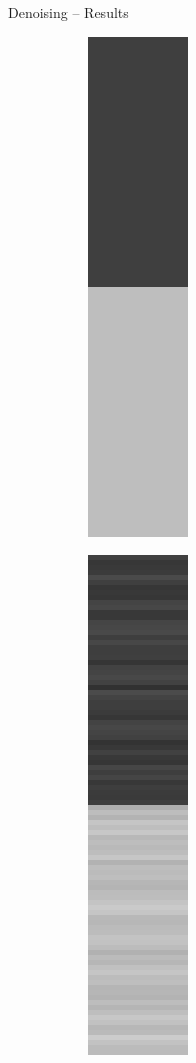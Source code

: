 \documentclass[t]{beamer}
\begin{document}
	\begin{frame}{Denoising -- Results}
		\begin{figure}[t]
			\centering
			\begin{subfigure}[t]{0.08\textwidth}
				\includegraphics[scale=0.25]{../paper/pictures/denoising/signal/signal.png}
			\end{subfigure}
			\begin{subfigure}[t]{0.08\textwidth}
				\includegraphics[scale=0.25]{../paper/pictures/denoising/signal/perturbed_signal.png}

\end{subfigure}
\end{figure}
\end{frame}
\end{document}
